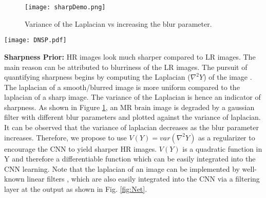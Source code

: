 \documentclass{article}
\def\sqz{\vspace{-3pt}}
\begin{document}
\begin{figure}
 \begin{center}
  \texttt{[image: sharpDemo.png]}
 \end{center}
  \vspace{-.5cm}
  \caption{\small{Variance of the Laplacian vs increasing the blur parameter.}}\sqz\sqz\sqz\sqz\sqz\sqz
  \label{fig:sharpDemo}
\end{figure}
\begin{figure*}[t]
	\begin{center}
		\texttt{[image: DNSP.pdf]}
	\end{center}
	\vspace{-.5cm}
	\caption{\small{Deep Network with Structural Priors (DNSP) for MR image super-resolution. Note the prior processing (shown in orange) is used {\em only} in the learning of the network. For a given test LR input image $X$, the learned CNN is used to generate the output SR image $Y$. }}\sqz\sqz\sqz\sqz
	\label{fig:Net}
\end{figure*}
\textbf{Sharpness Prior:} HR images look much sharper compared to LR images. The main reason can be attributed to blurriness of the LR images. The pursuit of quantifying sharpness begins by computing the Laplacian ($\nabla^{2}Y$) of the image \cite{forsyth2011computer}. The laplacian of a smooth/blurred image is more uniform compared to the laplacian of a sharp image. The variance of the Laplacian is hence an indicator of sharpness. As shown in Figure \ref{fig:sharpDemo}, an MR brain image is degraded by a gaussian filter with different blur parameters and plotted against the variance of laplacian. It can be observed that the variance of laplacian decreases as the blur parameter increases. Therefore, we propose to use $V(Y) = var(\nabla^{2}Y)$ as a regularizer to encourage the CNN to yield sharper HR images. $V(Y)$ is a quadratic function in Y and therefore a differentiable function which can be easily integrated into the CNN learning. Note that the laplacian of an image can be implemented by well-known linear filters \cite{forsyth2011computer}, which are also easily integrated into the CNN via a filtering layer at the output as shown in Fig. \ref{fig:Net}.
\end{document}
